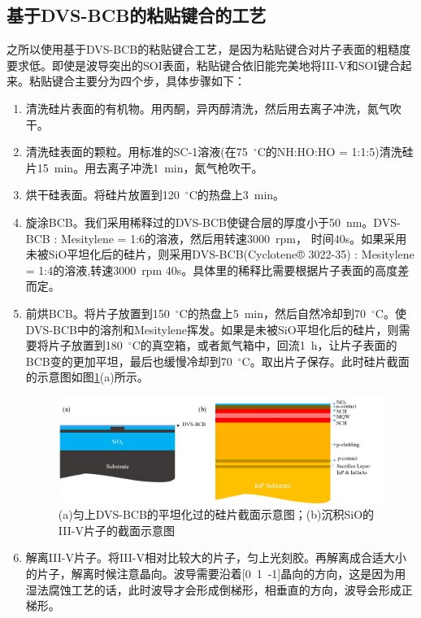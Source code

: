 \subsection{基于DVS-BCB的粘贴键合的工艺}
之所以使用基于DVS-BCB的粘贴键合工艺，是因为粘贴键合对片子表面的粗糙度要求低。即使是波导突出的SOI表面，粘贴键合依旧能完美地将III-V和SOI键合起来。粘贴键合主要分为四个步，具体步骤如下：
\begin{enumerate}[(1)]
	\item 清洗硅片表面的有机物。用丙酮，异丙醇清洗，然后用去离子冲洗，氮气吹干。
	\item 清洗硅表面的颗粒。用标准的SC-1溶液(在75~$^{\circ}$C的NH:HO:HO = 1:1:5)清洗硅片15~min。用去离子冲洗1~min，氮气枪吹干。
	\item 烘干硅表面。将硅片放置到120~$^{\circ}$C的热盘上3~min。
	\item 旋涂BCB。我们采用稀释过的DVS-BCB使键合层的厚度小于50~nm\cite{keyvaninia2013ultra}。DVS-BCB : Mesitylene = 1:6的溶液，然后用转速3000~rpm， 时间40s。如果采用未被SiO平坦化后的硅片，则采用DVS-BCB(Cyclotene® 3022-35)\cite{dvsbcb35} : Mesitylene = 1:4的溶液,转速3000~rpm 40s。具体里的稀释比需要根据片子表面的高度差而定。
	\item 前烘BCB。将片子放置到150~$^{\circ}$C的热盘上5~min，然后自然冷却到70~$^{\circ}$C。使DVS-BCB中的溶剂和Mesitylene挥发。如果是未被SiO平坦化后的硅片，则需要将片子放置到180~$^{\circ}$C的真空箱，或者氮气箱中，回流1~h，让片子表面的BCB变的更加平坦，最后也缓慢冷却到70~$^{\circ}$C。取出片子保存。此时硅片截面的示意图如图\ref{chapt4_bonding_diagram1}(a)所示。
	\begin{figure}[htb]
		\centering
		\includegraphics[width=14cm]{./Pictures/chapt4_bonding_diagram1.jpg}
		\caption{(a)匀上DVS-BCB的平坦化过的硅片截面示意图；(b)沉积SiO的III-V片子的截面示意图}
		\label{chapt4_bonding_diagram1}
	\end{figure}
	\item 解离III-V片子。将III-V相对比较大的片子，匀上光刻胶。再解离成合适大小的片子，解离时候注意晶向。波导需要沿着[0~1~-1]晶向的方向，这是因为用湿法腐蚀工艺的话，此时波导才会形成倒梯形，相垂直的方向，波导会形成正梯形。

\end{enumerate}
